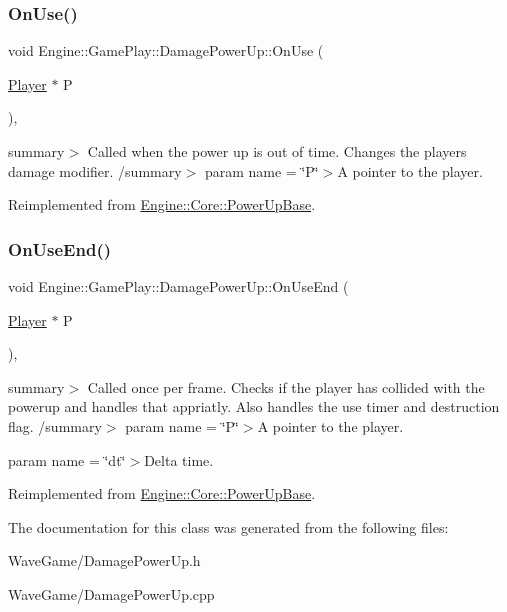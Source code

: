 \subsubsection{\texorpdfstring{On\+Use()}{OnUse()}}
{\footnotesize\ttfamily void Engine\+::\+Game\+Play\+::\+Damage\+Power\+Up\+::\+On\+Use (\begin{DoxyParamCaption}\item[{\hyperlink{class_engine_1_1_game_play_1_1_player}{Player} $\ast$}]{P }\end{DoxyParamCaption})\hspace{0.3cm}{\ttfamily [override]}, {\ttfamily [virtual]}}

summary$>$ Called when the power up is out of time. Changes the players damage modifier. /summary$>$ param name = \char`\"{}\+P\char`\"{}$>$A pointer to the player.

Reimplemented from \hyperlink{class_engine_1_1_core_1_1_power_up_base_a1c93516694b752a8ebc42eb181cb2b78}{Engine\+::\+Core\+::\+Power\+Up\+Base}.

\mbox{\label{class_engine_1_1_game_play_1_1_damage_power_up_a97bdd448602470ff4305b39eee866fd2}} 
\subsubsection{\texorpdfstring{On\+Use\+End()}{OnUseEnd()}}
{\footnotesize\ttfamily void Engine\+::\+Game\+Play\+::\+Damage\+Power\+Up\+::\+On\+Use\+End (\begin{DoxyParamCaption}\item[{\hyperlink{class_engine_1_1_game_play_1_1_player}{Player} $\ast$}]{P }\end{DoxyParamCaption})\hspace{0.3cm}{\ttfamily [override]}, {\ttfamily [virtual]}}

summary$>$ Called once per frame. Checks if the player has collided with the powerup and handles that appriatly. Also handles the use timer and destruction flag. /summary$>$ param name = \char`\"{}\+P\char`\"{}$>$A pointer to the player.

param name = \char`\"{}dt\char`\"{}$>$Delta time.

Reimplemented from \hyperlink{class_engine_1_1_core_1_1_power_up_base_a195aecea60afdb99add60661a1c95697}{Engine\+::\+Core\+::\+Power\+Up\+Base}.



The documentation for this class was generated from the following files\+:\begin{DoxyCompactItemize}
\item 
Wave\+Game/Damage\+Power\+Up.\+h\item 
Wave\+Game/Damage\+Power\+Up.\+cpp\end{DoxyCompactItemize}
